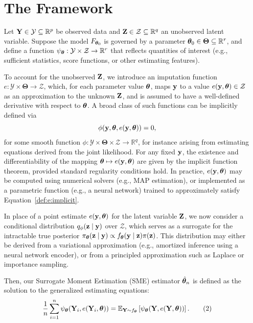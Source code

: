 \documentclass[twoside,11pt]{article}
\begin{document}
{\color{red}

\section{The Framework}

Let ${\bf Y} \in \mathcal{Y} \subseteq \mathbb{R}^p$ be observed data and ${\bf Z} \in \mathcal{Z} \subseteq \mathbb{R}^q$ an unobserved latent variable. Suppose the model $F_{{\bm{\theta}}_0}$ is governed by a parameter ${\bm{\theta}}_0 \in \bm{\Theta} \subseteq \mathbb{R}^r$, and define a function $\psi_{\bm{\theta}} : \mathcal{Y} \times \mathcal{Z} \to \mathbb{R}^r$ that reflects quantities of interest (e.g., sufficient statistics, score functions, or other estimating features).


To account for the unobserved ${\bf Z}$, we introduce an imputation function \(e : \mathcal{Y} \times \bm{\Theta} \to \mathcal{Z}\),
which, for each parameter value ${\bm{\theta}}$, maps ${\bf y}$ to a value \(e({\bf y}, {\bm{\theta}}) \in \mathcal{Z}\) as an approximation to the unknown ${\bf Z}$, and is assumed to have a well-defined derivative with respect to ${\bm{\theta}}$. A broad class of such functions can be implicitly defined via
\begin{equation}
    \phi({\bf y}, {\bm{\theta}}, e({\bf y}, {\bm{\theta}})) = 0,
\label{def:e:implicit}
\end{equation}
for some smooth function \(\phi : \mathcal{Y} \times \bm{\Theta} \times \mathcal{Z} \to \mathbb{R}^q\), for instance arising from estimating equations derived from the joint likelihood. For any fixed ${\bf y}$, the existence and differentiability of the mapping \({\bm{\theta}} \mapsto e({\bf y}, {\bm{\theta}})\) are given by the implicit function theorem, provided standard regularity conditions hold. In practice, \(e({\bf y}, {\bm{\theta}})\) may be computed using numerical solvers (e.g., MAP estimation), or implemented as a parametric function (e.g., a neural network) trained to approximately satisfy Equation~\eqref{def:e:implicit}.


In place of a point estimate \( e({\bf y}, {\bm{\theta}}) \) for the latent variable \( {\bf Z} \), we now consider a conditional distribution \( q_\phi({\bf z} \mid {\bf y}) \) over \( \mathcal{Z} \), which serves as a surrogate for the intractable true posterior \( \pi_{\bm{\theta}}({\bf z} \mid {\bf y}) \propto f_{\bm{\theta}}({\bf y} \mid {\bf z})\pi({\bf z}) \). This distribution may either be derived from a variational approximation (e.g., amortized inference using a neural network encoder), or from a principled approximation such as Laplace or importance sampling.



Then, our Surrogate Moment Estimation (SME) estimator $\hat{{\bm{\theta}}}_n$ is defined as the solution to the generalized estimating equations:
\begin{equation}
\frac{1}{n} \sum_{i=1}^n \psi_{\bm{\theta}}({\bf Y}_i, e({\bf Y}_i, {\bm{\theta}})) 
= 
\mathbb{E}_{{\bf Y} \sim f_{\bm{\theta}}} 
\left[ 
\psi_{\bm{\theta}}({\bf Y}, e({\bf Y}, {\bm{\theta}})) 
\right].
\tag{2}
\end{equation}



}
\end{document}
